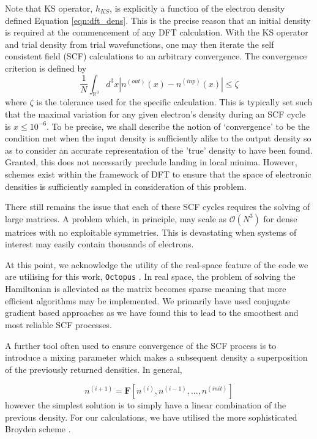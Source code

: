 Note that KS operator, $h_{KS}$, is explicitly a function of the electron density defined Equation \ref{eqn:dft_dens}. This is the precise reason that an initial density is required at the commencement of any DFT calculation. With the KS operator and trial density from trial wavefunctions, one may then iterate the self consistent field (SCF) calculations to an arbitrary convergence. The convergence criterion is defined by
\begin{equation}
    \frac{1}{N}  \int_{\mathbb{R}^{3}} d^{3}x \left| n^{(out)}(x) - n^{(inp)}(x)  \right|   \leq \zeta
    \label{eqn:conv}
\end{equation}
where $\zeta$ is the tolerance used for the specific calculation. This is typically set such that the maximal variation for any given electron's density during an SCF cycle is $x\leq10^{-6}$. To be precise, we shall describe the notion of `convergence' to be the condition met when the input density is sufficiently alike to the output density so as to consider an accurate representation of the 'true' density to have been found. Granted, this does not necessarily preclude landing in local minima. However, schemes exist within the framework of DFT to ensure that the space of electronic densities is sufficiently sampled in consideration of this problem.

There still remains the issue that each of these SCF cycles requires the solving of large matrices. A problem which, in principle, may scale as $\mathcal{O}(N^{3})$ for dense matrices with no exploitable symmetries. This is devastating when systems of interest may easily contain thousands of electrons. 

At this point, we acknowledge the utility of the real-space feature of the code we are utilising for this work, \texttt{Octopus} \cite{Octopus2003,Octopus_2006}. In real space, the problem of solving the Hamiltonian is alleviated as the matrix becomes sparse meaning that more efficient algorithms may be implemented. We primarily have used conjugate gradient based approaches as we have found this to lead to the smoothest and most reliable SCF processes.

A further tool often used to ensure convergence of the SCF process is to introduce a mixing parameter which makes a subsequent density a superposition of the previously returned densities. In general,

\begin{equation}
    n^{(i+1)} = \mathbf{F}\left[n^{(i)}, n^{(i-1)}, ..., n^{(init)} \right]
\end{equation}
however the simplest solution is to simply have a linear combination of the previous density. For our calculations, we have utilised the more sophisticated Broyden scheme \cite{Oct_2020}.

